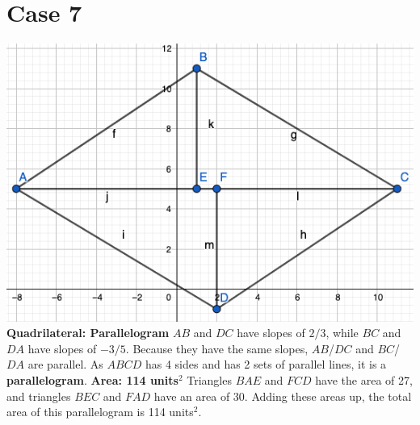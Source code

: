 \documentclass{article}
\begin{document}
	\section*{Case 7}
	\includegraphics[scale=0.4]{pics/Case7} \newline
	\textbf{Quadrilateral: Parallelogram} \newline
	$AB$ and $DC$ have slopes of $2/3$, while $BC$ and $DA$ have slopes of $-3/5$. \newline
	Because they have the same slopes, $AB$/$DC$ and $BC$/$DA$ are parallel. \newline
	As $ABCD$ has 4 sides and has 2 sets of parallel lines, it is a \textbf{parallelogram}. \newline \newline
	\textbf{Area: 114 units$^2$} \newline
	Triangles $BAE$ and $FCD$ have the area of 27, and triangles $BEC$ and $FAD$ have an area of 30. \newline
	Adding these areas up, the total area of this parallelogram is 114 units$^2$.
	\pagebreak
\end{document}
